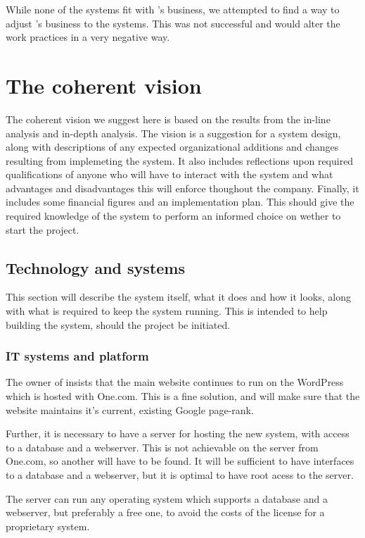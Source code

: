 While none of the systems fit with \gomonkey{}'s business, we attempted
to find a way to adjust \gomonkey{}'s business to the systems. This was not 
successful and would alter the work practices in a very negative way.

\newpage
\section{The coherent vision}
The coherent vision we suggest here is based on the results from the in-line 
analysis and in-depth analysis. The vision is a suggestion for a system design, 
along with descriptions of any expected organizational additions and changes 
resulting from implemeting the system. It also includes reflections upon 
required qualifications of anyone who will have to interact with the system
and what advantages and disadvantages this will enforce thoughout the company.
Finally, it includes some financial figures and an implementation plan. This 
should give the required knowledge of the system to perform an informed choice
on wether to start the project.

\subsection{Technology and systems}
This section will describe the system itself, what it does and how it looks,
along with what is required to keep the system running. This is intended to 
help building the system, should the project be initiated.

\subsubsection{IT systems and platform}
The owner of \gomonkey{} insists that the main website continues to run on the 
WordPress which is hosted with One.com. This is a fine solution, and will make
sure that the website maintains it's current, existing Google page-rank.

Further, it is necessary to have a server for hosting the new system, with 
access to a database and a webserver. This is not achievable on the server from 
One.com, so another will have to be found. It will be sufficient to have 
interfaces to a database and a webserver, but it is optimal to have root acess
to the server.

The server can run any operating system which supports a database and a 
webserver, but preferably a free one, to avoid the costs of the license for a 
proprietary system.

